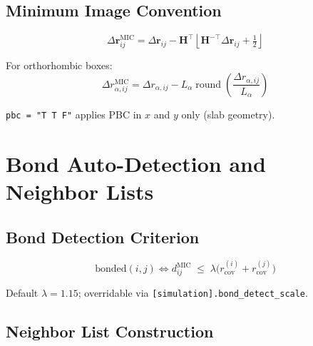 \documentclass[11pt, a4paper, oneside]{article}
\newcommand{\rcov}{r_{\mathrm{cov}}}
\newcommand{\rvec}{\mathbf{r}}
\begin{document}
\subsection{Minimum Image Convention}
\label{sec:pbc_mic}

\begin{equation}
  \Delta\rvec_{ij}^{\mathrm{MIC}}
  = \Delta\rvec_{ij}
  - \mathbf{H}^\top
    \left\lfloor \mathbf{H}^{-\top} \Delta\rvec_{ij} + \tfrac{1}{2} \right\rfloor
  \label{eq:mic}
\end{equation}

For orthorhombic boxes:
\begin{equation}
  \Delta r_{\alpha,ij}^{\mathrm{MIC}}
  = \Delta r_{\alpha,ij}
    - L_\alpha \operatorname{round}\!\left(\frac{\Delta r_{\alpha,ij}}{L_\alpha}\right)
  \label{eq:mic_ortho}
\end{equation}

\texttt{pbc = "T T F"} applies PBC in $x$ and $y$ only (slab geometry).

\section{Bond Auto-Detection and Neighbor Lists}
\label{sec:bonds}

\subsection{Bond Detection Criterion}
\label{sec:bonds_criterion}

\begin{equation}
  \mathrm{bonded}(i,j)
  \iff
  d_{ij}^{\mathrm{MIC}}
  \;\leq\;
  \lambda \bigl(\rcov^{(i)} + \rcov^{(j)}\bigr)
  \label{eq:bond}
\end{equation}

Default $\lambda = 1.15$; overridable via
\texttt{[simulation].bond\_detect\_scale}.

\subsection{Neighbor List Construction}
\label{sec:bonds_neighborlist}
\end{document}
